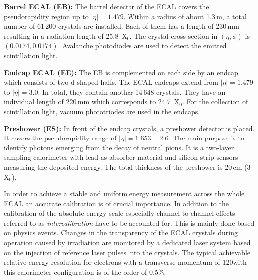 \begin{description}
 \item \textbf{Barrel ECAL (EB):} The barrel detector of the ECAL covers the pseudorapidity region up to $|\eta| = 1.479$. Within a radius of about 1.3\,m, a total number of 61\,200 crystals are installed. Each of them has a length of 230\,mm resulting in a radiation length of 25.8~$\mathrm{X_0}$. The crystal cross section in $(\eta, \phi)$ is $(0.0174, 0.0174)$. Avalanche photodiodes are used to detect the emitted scintillation light.
 \item \textbf{Endcap ECAL (EE):} The EB is complemented on each side by an endcap which consists of two d-shaped halfs. The ECAL endcaps extend from $|\eta| = 1.479$ to $|\eta| = 3.0$. In total, they contain another 14\,648 crystals. They have an individual length of 220\,mm which corresponds to 24.7~$\mathrm{X}_0$. For the collection of scintillation light, vacuum phototriodes are used in the endcaps.
 \item \textbf{Preshower (ES):} In front of the endcap crystals, a preshower detector is placed. It covers the pseudorapidity range of $|\eta| = 1.653 - 2.6$. The main purpose is to identify photons emerging from the decay of neutral pions. It is a two-layer sampling calorimeter with lead as absorber material and silicon strip sensors measuring the deposited energy. The total thickness of the preshower is 20\,cm (3~$\mathrm{X_0}$).
\end{description}
In order to achieve a stable and uniform energy measurement across the whole ECAL an accurate calibration is of crucial importance. In addition to the calibration of the absolute energy scale especially channel-to-channel effects referred to as \textit{intercalibration} have to be accounted for. This is mainly done based on physics events. Changes in the transparency of the ECAL crystals during operation caused by irradiation are monitored by a dedicated laser system based on the injection of reference laser pulses into the crystals. The typical achievable relative energy resolution for electrons with a transverse momentum of 120\gev with this calorimeter configuration is of the order of 0.5\%.

